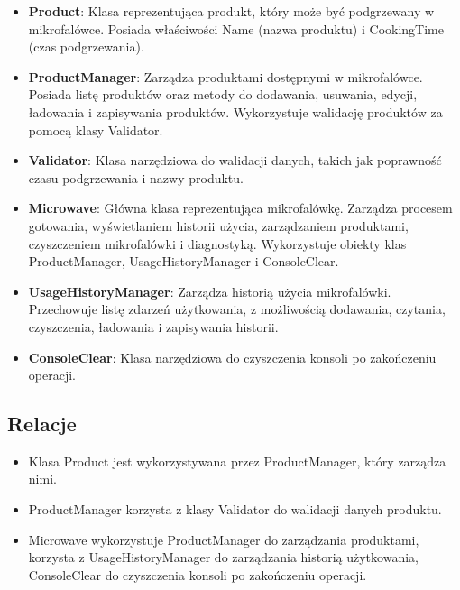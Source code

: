 \begin{itemize}
  \item \textbf{Product}: Klasa reprezentująca produkt, który może być podgrzewany w mikrofalówce. Posiada właściwości Name (nazwa produktu) i CookingTime (czas podgrzewania).
  \item \textbf{ProductManager}: Zarządza produktami dostępnymi w mikrofalówce. Posiada listę produktów oraz metody do dodawania, usuwania, edycji, ładowania i zapisywania produktów. Wykorzystuje walidację produktów za pomocą klasy Validator.
  \item \textbf{Validator}: Klasa narzędziowa do walidacji danych, takich jak poprawność czasu podgrzewania i nazwy produktu.
  \item \textbf{Microwave}: Główna klasa reprezentująca mikrofalówkę. Zarządza procesem gotowania, wyświetlaniem historii użycia, zarządzaniem produktami, czyszczeniem mikrofalówki i diagnostyką.  Wykorzystuje obiekty klas ProductManager, UsageHistoryManager i ConsoleClear.
  \item \textbf{UsageHistoryManager}: Zarządza historią użycia mikrofalówki. Przechowuje listę zdarzeń użytkowania, z możliwością dodawania, czytania, czyszczenia, ładowania i zapisywania historii.
  \item \textbf{ConsoleClear}: Klasa narzędziowa do czyszczenia konsoli po zakończeniu operacji.
\end{itemize}


\subsection{Relacje}

\begin{itemize}
  \item Klasa Product jest wykorzystywana przez ProductManager, który zarządza nimi.
  \item ProductManager korzysta z klasy Validator do walidacji danych produktu.
  \item Microwave wykorzystuje ProductManager do zarządzania produktami, korzysta z UsageHistoryManager do zarządzania historią użytkowania, ConsoleClear do czyszczenia konsoli po zakończeniu operacji.
\end{itemize}
